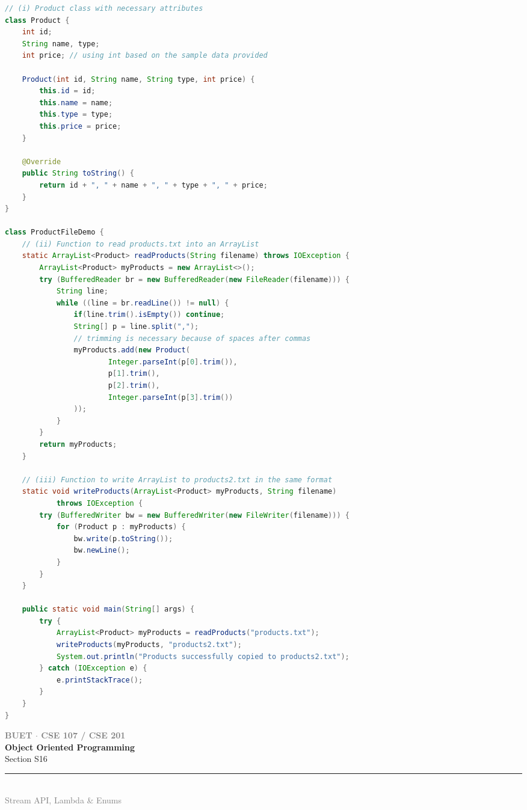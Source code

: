 \documentclass[12pt,a3paper]{article}
\newcommand{\secdivider}[4]{%
  \newpage\thispagestyle{empty}%
  \vspace*{\fill}%
  \begin{tcolorbox}[enhanced,colback=#4!7,colframe=#3,boxrule=1.5pt,arc=8pt,
    left=20pt,right=20pt,top=22pt,bottom=22pt,
    shadow={3pt}{-3pt}{0pt}{black!15}]
    \centering
    {\large\textcolor{gray}{\textbf{BUET $\cdot$ CSE 107 / CSE 201}}}\\[8pt]
    {\fontsize{26}{32}\selectfont\bfseries\textcolor{#3}{Object Oriented Programming}}\\[6pt]
    {\fontsize{15}{19}\selectfont\textcolor{dgray}{#1}}\\[12pt]
    \textcolor{#3!60}{\rule{0.5\textwidth}{0.5pt}}\\[6pt]
    {\small\textcolor{gray}{#2}}
  \end{tcolorbox}%
  \vspace*{\fill}\newpage%
}
\begin{document}
\begin{enumerate}
\begin{tcolorbox}[enhanced,breakable,ansbox,
  colback=cG!4,colframe=cG,boxrule=0.8pt,arc=5pt,
  title={\textbf{Answer --- Product Read/Write from File}},
  fonttitle=\bfseries\color{white},colbacktitle=cG]
\begin{lstlisting}[language=Java]
// (i) Product class with necessary attributes
class Product {
    int id; 
    String name, type; 
    int price; // using int based on the sample data provided

    Product(int id, String name, String type, int price) {
        this.id = id; 
        this.name = name; 
        this.type = type; 
        this.price = price;
    }

    @Override
    public String toString() {
        return id + ", " + name + ", " + type + ", " + price;
    }
}

class ProductFileDemo {
    // (ii) Function to read products.txt into an ArrayList
    static ArrayList<Product> readProducts(String filename) throws IOException {
        ArrayList<Product> myProducts = new ArrayList<>();
        try (BufferedReader br = new BufferedReader(new FileReader(filename))) {
            String line;
            while ((line = br.readLine()) != null) {
                if(line.trim().isEmpty()) continue;
                String[] p = line.split(",");
                // trimming is necessary because of spaces after commas
                myProducts.add(new Product(
                        Integer.parseInt(p[0].trim()),
                        p[1].trim(), 
                        p[2].trim(), 
                        Integer.parseInt(p[3].trim())
                ));
            }
        }
        return myProducts;
    }

    // (iii) Function to write ArrayList to products2.txt in the same format
    static void writeProducts(ArrayList<Product> myProducts, String filename) 
            throws IOException {
        try (BufferedWriter bw = new BufferedWriter(new FileWriter(filename))) {
            for (Product p : myProducts) {
                bw.write(p.toString());
                bw.newLine();
            }
        }
    }

    public static void main(String[] args) {
        try {
            ArrayList<Product> myProducts = readProducts("products.txt");
            writeProducts(myProducts, "products2.txt");
            System.out.println("Products successfully copied to products2.txt");
        } catch (IOException e) {
            e.printStackTrace();
        }
    }
}
\end{lstlisting}
\end{tcolorbox}

\end{enumerate}
\newpage

\secdivider{Section S16}{Stream API, Lambda \& Enums}{cH}{cH}
\titleformat{\section}{\large\bfseries\color{cH}}{}{0em}{}[\titlerule]
\end{document}
